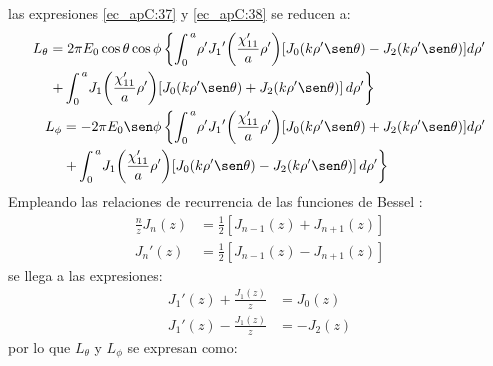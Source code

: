 las expresiones \eqref{ec_apC:37} y \eqref{ec_apC:38} se reducen a:
\begin{subequations}
\label{grup_ec_apC:10}
\begin{align}
\begin{split}
L_{\theta}  &= 2\pi E_0\cos\theta\cos\phi\left\{\int_{0}^{\,a}\!\rho '{J_1}'\!\left(\frac{\chi '_{11}}{a}\rho '\right)\!\left[J_0\!\left(k\rho '\sen\theta\right) - J_2\!\left(k\rho '\sen\theta\right)\right]\!d\rho '\right.\\
&\left.+\int_{0}^{\,a}\!J_1\!\left(\frac{\chi '_{11}}{a}\rho '\right)\!\left[J_0\!\left(k\rho '\sen\theta\right) + J_2\!\left(k\rho '\sen\theta\right)\right]d\rho '\right\}
\end{split}
\label{ec_apC:43}\\
\begin{split}
L_{\phi} &= - 2\pi E_0\sen\phi\left\{\int_{0}^{\,a}\!\rho '{J_1}'\!\left(\frac{\chi '_{11}}{a}\rho '\right)\!\left[J_0\!\left(k\rho '\sen\theta\right) + J_2\!\left(k\rho '\sen\theta\right)\right]\!d\rho '\right.\\
&\left.+\int_{0}^{\,a}\!J_1\!\left(\frac{\chi '_{11}}{a}\rho '\right)\!\left[J_0\!\left(k\rho '\sen\theta\right) - J_2\!\left(k\rho '\sen\theta\right)\right]d\rho '\right\}
\end{split}
\label{ec_apC:44}
\end{align}
\end{subequations}
Empleando las relaciones de recurrencia de las funciones de Bessel \cite{walfram_bessel_first}:
\begin{align}
\frac{n}{z}J_n\!\left(z\right) &= \frac{1}{2}\left[J_{n - 1}\!\left(z\right) + J_{n + 1}\!\left(z\right)\right]
\label{ec_apC:45}\\
{J_n}'\!\left(z\right) &= \frac{1}{2}\left[J_{n - 1}\!\left(z\right) - J_{n + 1}\!\left(z\right)\right]
\label{ec_apC:46}
\end{align}
se llega a las expresiones:
\begin{align}
{J_1}'\!\left(z\right) + \frac{J_1\!\left(z\right)}{z} &= J_0\!\left(z\right)
\label{ec_apC:47}\\
{J_1}'\!\left(z\right) - \frac{J_1\!\left(z\right)}{z} &= -J_2\!\left(z\right)
\label{ec_apC:48}
\end{align}
por lo que $L_{\theta}$ y $L_{\phi}$ se expresan como:
